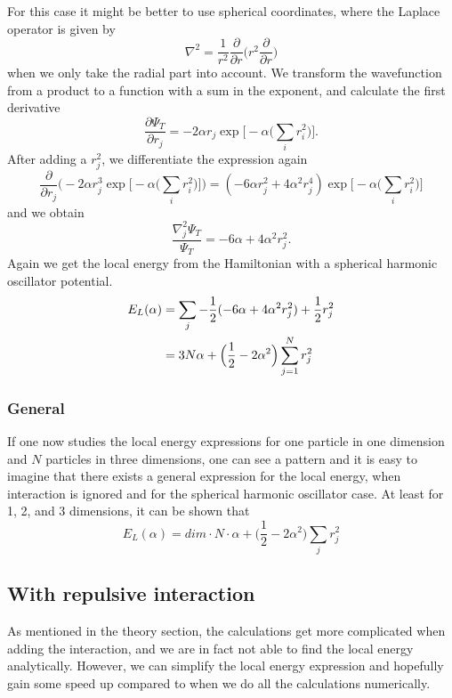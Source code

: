 \documentclass[norsk,a4paper,12pt]{article}
\begin{document}
For this case it might be better to use spherical coordinates, where the Laplace operator is given by
\begin{equation}
\nabla^2=\frac{1}{r^2}\frac{\partial}{\partial r}\bigg(r^2\frac{\partial}{\partial r}\bigg)
\end{equation}
when we only take the radial part into account. We transform the wavefunction from a product to a function with a sum in the exponent, and calculate the first derivative
\begin{equation}
\frac{\partial\Psi_T}{\partial r_j}=-2\alpha r_j \exp\bigg[-\alpha\bigg(\sum_i r_i^2\bigg)\bigg].
\end{equation}
After adding a $r_j^2$, we differentiate the expression again
\begin{equation*}
\frac{\partial}{\partial r_j}\bigg(-2\alpha r_j^3\exp\Big[-\alpha\Big(\sum_i r_i^2\Big)\Big]\bigg)
=(-6\alpha r_j^2 + 4\alpha^2r_j^4)\exp\Big[-\alpha\Big(\sum_i r_i^2\Big)\Big]
\end{equation*}
and we obtain
\begin{equation}
\frac{\nabla_j^2\Psi_T}{\Psi_T}=-6\alpha+4\alpha^2r_j^2.
\end{equation}
Again we get the local energy from the Hamiltonian with a spherical harmonic oscillator potential. 
\begin{align}
E_L(\alpha)&=\sum_j-\frac{1}{2}(-6\alpha+4\alpha^2r_j^2) + \frac{1}{2}r_j^2\notag\\
&=3N\alpha + \Big(\frac{1}{2}-2\alpha^2\Big)\sum_{j=1}^Nr_j^2
\end{align}

\subsubsection{General}
If one now studies the local energy expressions for one particle in one dimension and $N$ particles in three dimensions, one can see a pattern and it is easy to imagine that there exists a general expression for the local energy, when interaction is ignored and for the spherical harmonic oscillator case. At least for 1, 2, and 3 dimensions, it can be shown that 
\begin{equation}
E_L(\alpha)=dim\cdot N\cdot \alpha+\Big(\frac{1}{2}-2\alpha^2\Big)\sum_jr_j^2
\end{equation}

\subsection{With repulsive interaction}
As mentioned in the theory section, the calculations get more complicated when adding the interaction, and we are in fact not able to find the local energy analytically. However, we can simplify the local energy expression and hopefully gain some speed up compared to when we do all the calculations numerically. 
\end{document}
